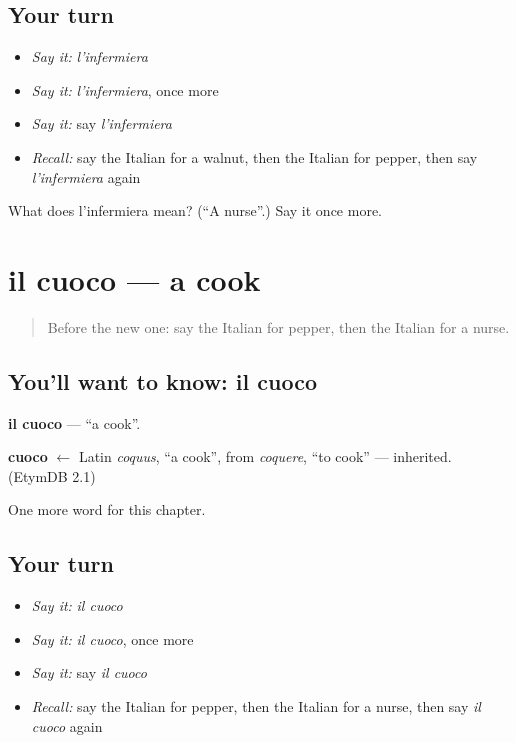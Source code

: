 \subsection*{Your turn}
\begin{itemize}
\raggedright
  \item \emph{Say it:} \emph{l'infermiera}
  \item \emph{Say it:} \emph{l'infermiera}, once more
  \item \emph{Say it:} say \emph{l'infermiera}
  \item \emph{Recall:} say the Italian for a walnut, then the Italian for pepper, then say \emph{l'infermiera} again
\end{itemize}

\begin{tcolorbox}[breakable,colback=teal!4,colframe=teal!35!black,title={Before you move on}]
What does l'infermiera mean? (\textquotedblleft{}A nurse\textquotedblright{}.) Say it once more.
\end{tcolorbox}
\section[il cuoco]{il cuoco — a cook}

\label{lesson:IT-C111-cuoco}



\begin{quote}
Before the new one: say the Italian for pepper, then the Italian for a nurse.
\end{quote}

\subsection*{You'll want to know: il cuoco}
\textbf{il cuoco} — \textquotedblleft{}a cook\textquotedblright{}.

\begin{cousinweb}
\textbf{cuoco} $\leftarrow$ Latin \emph{coquus}, \textquotedblleft{}a cook\textquotedblright{}, from \emph{coquere}, \textquotedblleft{}to cook\textquotedblright{} — inherited. (EtymDB 2.1)
\end{cousinweb}

\begin{grammarlens}[title={What you've built}]
One more word for this chapter.
\end{grammarlens}

\subsection*{Your turn}
\begin{itemize}
\raggedright
  \item \emph{Say it:} \emph{il cuoco}
  \item \emph{Say it:} \emph{il cuoco}, once more
  \item \emph{Say it:} say \emph{il cuoco}
  \item \emph{Recall:} say the Italian for pepper, then the Italian for a nurse, then say \emph{il cuoco} again
\end{itemize}

